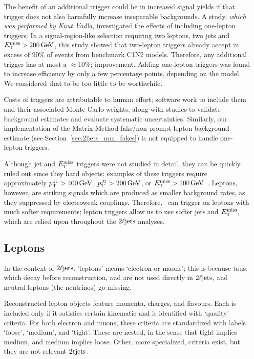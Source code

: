 The benefit of an additional trigger could be in increased signal yields if
that trigger does not also harmfully increase inseparable backgrounds.
A study, \emph{which was performed by Knut Vadla}, investigated the effects
of including one-lepton triggers.
In a signal-region-like selection requiring two leptons, two jets and
$\met > 200\,\eV[G]$, this study showed that two-lepton triggers already accept
in excess of $90\%$ of events from benchmark C1N2 models.
Therefore, any additional trigger has at most a $\approx10\%$;
improvement. Adding one-lepton triggers was found to increase efficiency by
only a few percentage points, depending on the model.
We considered that to be too little to be worthwhile.

Costs of triggers are attributable to human effort;
software work to include them and their associated Monte Carlo weights, along
with studies to validate background estimates and evaluate systematic
uncertainties.
Similarly, our implementation of the Matrix Method fake/non-prompt lepton
background estimate (see Section~\ref{sec:2ljets_mm_fakes}) is not equipped to
handle one-lepton triggers.

Although jet and $\met$ triggers were not studied in detail, they can be
quickly ruled out since they hard objects: examples of these triggers require
approximately $\ptjone > 400\,\eV[G]$, $p_\mathrm{T}^{\,j_3} > 200\,\eV[G]$, or
$\met > 100\,\eV[G]$~\cite{atlas_twiki_lowest_unprescaled}.
Leptons, however, are striking signals which are produced as smaller background
rates, as they suppressed by electroweak couplings.
Therefore, \atlas\ can trigger on leptons with much softer requirements;
lepton triggers allow us to use softer jets and $\met$, which are relied upon
throughout the $\twoljets$ analyses.


\subsection{Leptons}
\label{sec:2ljets_events_leptons}
In the context of $\twoljets$, `leptons' means `electron-or-muons';
this is because taus, which decay before reconstruction, and are not used
directly in $\twoljets$, and neutral leptons (the neutrinos) go missing.

Reconstructed lepton objects feature momenta, charges, and flavours.
Each is included only if it satisfies certain kinematic and
is identified with `quality' criteria.
For both electron and muons, these criteria are standardized with labels
`loose', `medium', and `tight'.
These are nested, in the sense that tight implies medium,
and medium implies loose.
Other, more specialized, criteria exist, but they are not relevant $\twoljets$.

